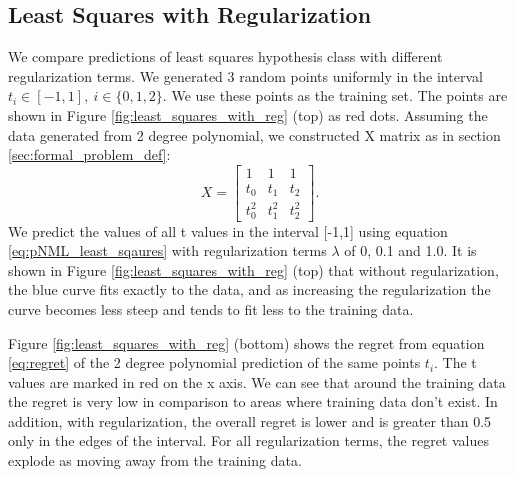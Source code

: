 \documentclass[conference,letterpaper]{IEEEtran}
\begin{document}
\subsection{Least Squares with Regularization} \label{sec:least_sqaures_with_reg}
We compare predictions of least squares hypothesis class with different regularization terms.
We generated 3 random points uniformly in the interval $t_i \in [-1, 1],\ i \in \{0,1,2\}$. We use these points as the training set. 
The points are shown in Figure \ref{fig:least_squares_with_reg} (top) as red dots. 
Assuming the data generated from 2 degree polynomial, we constructed X matrix as in section \ref{sec:formal_problem_def}:
\begin{equation}
X = 
\begin{bmatrix}
1 & 1 & 1 \\
t_0 & t_1 & t_2 \\
t_0^2 & t_1^2 & t_2^2 
\end{bmatrix}.
\end{equation}
We predict the values of all t values in the interval [-1,1] using equation \ref{eq:pNML_least_sqaures} with regularization terms $\lambda$ of 0, 0.1 and 1.0. 
It is shown in Figure \ref{fig:least_squares_with_reg} (top) that without regularization, the blue curve fits exactly to the data, and as increasing the regularization the curve becomes less steep and tends to fit less to the training data.

Figure \ref{fig:least_squares_with_reg} (bottom) shows the regret from equation \ref{eq:regret} of the 2 degree polynomial prediction of the same points $t_i$. 
The t values are marked in red on the x axis. 
We can see that around the training data the regret is very low in comparison to areas where training data don't exist. 
In addition, with regularization, the overall regret is lower and is greater than 0.5 only in the edges of the interval.
For all regularization terms, the regret values explode as moving away from the training data.
\end{document}
